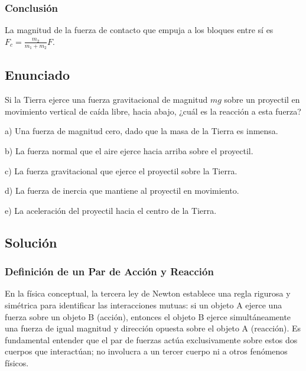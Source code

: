 \documentclass[12pt]{article}
\begin{document}
\subsubsection*{Conclusión}
La magnitud de la fuerza de contacto que empuja a los bloques entre sí es $F_c = \frac{m_2}{m_1 + m_2}F$.

\newpage

\subsection*{Enunciado}
Si la Tierra ejerce una fuerza gravitacional de magnitud $mg$ sobre un proyectil en movimiento vertical de caída libre, hacia abajo, ¿cuál es la reacción a esta fuerza?

a) Una fuerza de magnitud cero, dado que la masa de la Tierra es inmensa.

b) La fuerza normal que el aire ejerce hacia arriba sobre el proyectil.

c) La fuerza gravitacional que ejerce el proyectil sobre la Tierra.

d) La fuerza de inercia que mantiene al proyectil en movimiento.

e) La aceleración del proyectil hacia el centro de la Tierra.

\subsection*{Solución}

\subsubsection*{Definición de un Par de Acción y Reacción}
En la física conceptual, la tercera ley de Newton establece una regla rigurosa y simétrica para identificar las interacciones mutuas: si un objeto A ejerce una fuerza sobre un objeto B (acción), entonces el objeto B ejerce simultáneamente una fuerza de igual magnitud y dirección opuesta sobre el objeto A (reacción). Es fundamental entender que el par de fuerzas actúa exclusivamente sobre estos dos cuerpos que interactúan; no involucra a un tercer cuerpo ni a otros fenómenos físicos.
\end{document}
